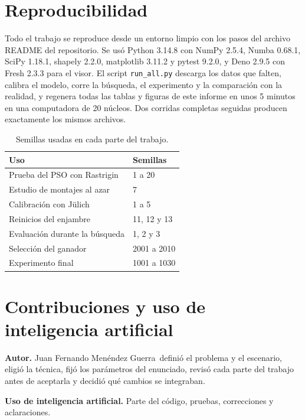 \documentclass[11pt,letterpaper]{article}
\newcommand{\autor}{Juan Fernando Men\'endez Guerra}
\begin{document}
\section{Reproducibilidad}
Todo el trabajo se reproduce desde un entorno limpio con los pasos del archivo README del repositorio. Se usó Python 3.14.8 con NumPy 2.5.4, Numba 0.68.1, SciPy 1.18.1, shapely 2.2.0, matplotlib 3.11.2 y pytest 9.2.0, y Deno 2.9.5 con Fresh 2.3.3 para el visor. El script \texttt{run\_all.py} descarga los datos que falten, calibra el modelo, corre la búsqueda, el experimento y la comparación con la realidad, y regenera todas las tablas y figuras de este informe en unos 5 minutos en una computadora de 20 núcleos. Dos corridas completas seguidas producen exactamente los mismos archivos.

\begin{table}[H]
\centering
\caption{Semillas usadas en cada parte del trabajo.}
\begin{tabular}{ll}
\toprule
Uso & Semillas \\
\midrule
Prueba del PSO con Rastrigin & 1 a 20 \\
Estudio de montajes al azar & 7 \\
Calibración con Jülich & 1 a 5 \\
Reinicios del enjambre & 11, 12 y 13 \\
Evaluación durante la búsqueda & 1, 2 y 3 \\
Selección del ganador & 2001 a 2010 \\
Experimento final & 1001 a 1030 \\
\bottomrule
\end{tabular}
\end{table}

\section{Contribuciones y uso de inteligencia artificial}
\textbf{Autor.} \autor\ definió el problema y el escenario, eligió la técnica, fijó los parámetros del enunciado, revisó cada parte del trabajo antes de aceptarla y decidió qué cambios se integraban.

\textbf{Uso de inteligencia artificial.} Parte del código, pruebas, correcciones y aclaraciones.

\printbibliography[title={Referencias}]
\end{document}
